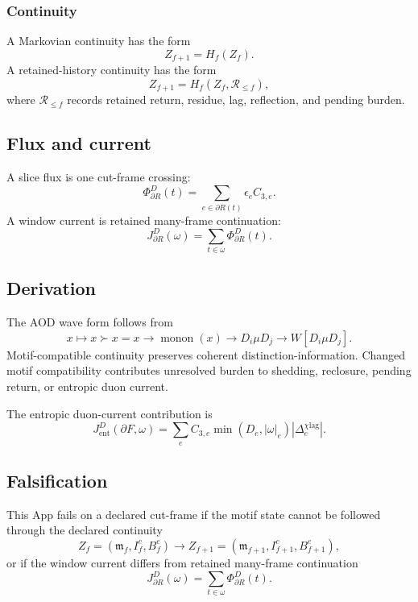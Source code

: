\subsubsection{Continuity}
\label{app:wave:statements:continuity}
A Markovian continuity has the form
\begin{equation}
Z_{f+1}=H_f(Z_f).
\label{app:wave:eq:markovian}
\end{equation}
A retained-history continuity has the form
\begin{equation}
Z_{f+1}=H_f(Z_f,\mathcal R_{\le f}),
\label{app:wave:eq:retained-history}
\end{equation}
where \(\mathcal R_{\le f}\) records retained return, residue, lag, reflection, and pending burden.

\subsection{Flux and current}
\label{app:wave:flux-current}
A slice flux is one cut-frame crossing:
\begin{equation}
\Phi^D_{\partial R}(t)
=
\sum_{e\in\partial R(t)}
\epsilon_e C_{3,e}.
\label{app:wave:eq:slice-flux}
\end{equation}
A window current is retained many-frame continuation:
\begin{equation}
J^D_{\partial R}(\omega)
=
\sum_{t\in\omega}
\Phi^D_{\partial R}(t).
\label{app:wave:eq:window-current}
\end{equation}

\subsection{Derivation}
\label{app:wave:derivation}
The AOD wave form follows from
\[
x\mapsto x\succ x=x
\to
\operatorname{monon}(x)
\to
D_i\mu D_j
\to
W[D_i\mu D_j].
\]
Motif-compatible continuity preserves coherent distinction-information. Changed motif compatibility contributes unresolved burden to shedding, reclosure, pending return, or entropic duon current.

The entropic duon-current contribution is
\begin{equation}
J^D_{\mathrm{ent}}(\partial F,\omega)
=
\sum_e
C_{3,e}
\min(D_e,|\omega|_e)
|\Delta^{\chi\mathrm{lag}}_e|.
\label{app:wave:eq:entropic-current}
\end{equation}

\subsection{Falsification}
\label{app:wave:falsification}
This App fails on a declared cut-frame if the motif state cannot be followed through the declared continuity
\[
Z_f=(\mathfrak m_f,I^c_f,B^e_f)
\to
Z_{f+1}=(\mathfrak m_{f+1},I^c_{f+1},B^e_{f+1}),
\]
or if the window current differs from retained many-frame continuation
\[
J^D_{\partial R}(\omega)
=
\sum_{t\in\omega}
\Phi^D_{\partial R}(t).
\]

